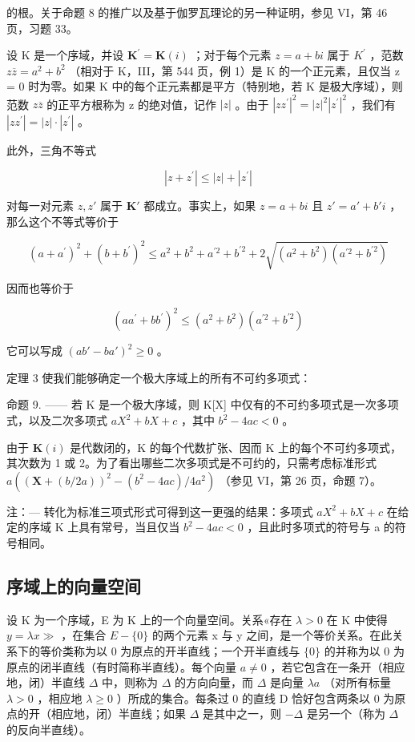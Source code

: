 的根。关于命题 8 的推广以及基于伽罗瓦理论的另一种证明，参见 VI，第 46 页，习题 33。

设 K 是一个序域，并设 \(\mathbf{K}^{\prime} = \mathbf{K}(i)\) ；对于每个元素 \(z = a + bi\) 属于 \(K^{\prime}\) ，范数 \(z\overline{z} = a^{2} + b^{2}\) （相对于 K，III，第 544 页，例 1）是 K 的一个正元素，且仅当 z = 0 时为零。如果 K 中的每个正元素都是平方（特别地，若 K 是极大序域），则范数 \(z\overline{z}\) 的正平方根称为 z 的绝对值，记作 \(|z|\) 。由于 \(|zz^{\prime}|^{2} = |z|^{2} |z^{\prime}|^{2}\) ，我们有 \(|zz^{\prime}| = |z| \cdot |z^{\prime}|\) 。

此外，三角不等式

\[
\left| z + z ^ {\prime} \right| \leqslant \left| z \right| + \left| z ^ {\prime} \right|
\]

对每一对元素 \(z, z'\) 属于 \(\mathbf{K}'\) 都成立。事实上，如果 \(z = a + bi\) 且 \(z' = a' + b'i\) ，那么这个不等式等价于

\[
(a + a ^ {\prime}) ^ {2} + (b + b ^ {\prime}) ^ {2} \leqslant a ^ {2} + b ^ {2} + a ^ {\prime 2} + b ^ {\prime 2} + 2 \sqrt {(a ^ {2} + b ^ {2}) (a ^ {\prime 2} + b ^ {\prime 2})}
\]

因而也等价于

\[
(a a ^ {\prime} + b b ^ {\prime}) ^ {2} \leqslant (a ^ {2} + b ^ {2}) (a ^ {\prime 2} + b ^ {\prime 2})
\]

它可以写成 \((ab' - ba')^2 \geqslant 0\) 。

定理 3 使我们能够确定一个极大序域上的所有不可约多项式：

命题 9. —— 若 K 是一个极大序域，则 K{[}X{]} 中仅有的不可约多项式是一次多项式，以及二次多项式 \(aX^{2} + bX + c\) ，其中 \(b^{2} - 4ac < 0\) 。

由于 \(\mathbf{K}(i)\) 是代数闭的，K 的每个代数扩张、因而 K 上的每个不可约多项式，其次数为 1 或 2。为了看出哪些二次多项式是不可约的，只需考虑标准形式 \(a((\mathbf{X} + (b/2a))^2 - (b^2 - 4ac)/4a^2)\) （参见 VI，第 26 页，命题 7）。

注：--- 转化为标准三项式形式可得到这一更强的结果：多项式 \(aX^{2} + bX + c\) 在给定的序域 K 上具有常号，当且仅当 \(b^{2} - 4ac < 0\) ，且此时多项式的符号与 a 的符号相同。

\subsection{序域上的向量空间}

设 K 为一个序域，E 为 K 上的一个向量空间。关系«存在 \(\lambda > 0\) 在 K 中使得 \(y = \lambda x \gg\) ，在集合 \(E - \{0\}\) 的两个元素 x 与 y 之间，是一个等价关系。在此关系下的等价类称为以 0 为原点的开半直线；一个开半直线与 \(\{0\}\) 的并称为以 0 为原点的闭半直线（有时简称半直线）。每个向量 \(a \neq 0\) ，若它包含在一条开（相应地，闭）半直线 \(\Delta\) 中，则称为 \(\Delta\) 的方向向量，而 \(\Delta\) 是向量 \(\lambda a\) （对所有标量 \(\lambda > 0\) ，相应地 \(\lambda \geqslant 0\) ）所成的集合。每条过 0 的直线 D 恰好包含两条以 0 为原点的开（相应地，闭）半直线；如果 \(\Delta\) 是其中之一，则 \(-\Delta\) 是另一个（称为 \(\Delta\) 的反向半直线）。

